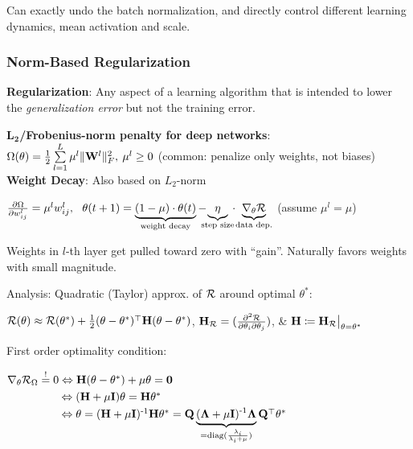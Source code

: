         Can exactly undo the batch normalization, and directly control different learning dynamics, mean activation and scale.
    
    \subsubsection{Norm-Based Regularization}
    \label{ssub:normbasedregularization}
        \textbf{Regularization}: Any aspect of a learning algorithm that is intended to lower the \emph{generalization error} but not the training error.
        
        \textbf{$\mathbf{L_2}$/Frobenius-norm penalty for deep networks}:\\ \tab$\Omega(\theta)=\frac{1}{2}\sum\limits_{l=1}^L\mu^l\lVert\mathbf W^l\rVert^2_F,\>\mu^l\geq0$ \begingroup\tiny{(common: penalize only weights, not biases)}\endgroup\\
        
        \textbf{Weight Decay}: Also based on $L_2$-norm
        
        \tab$\frac{\partial \Omega}{\partial w^l_{ij}}=\mu^l w^l_{ij},\>\>\>\theta(t+1)=\underbrace{(1-\mu)\cdot\theta(t)}_\text{weight decay}-\!\!\!\!\underbrace{\eta}_\text{step size}\!\!\cdot\!\underbrace{\nabla_\theta\mathcal{R}}_\text{data dep.}$ (assume $\mu^l=\mu$)
        
        Weights in $l$-th layer get pulled toward zero with ``gain''. Naturally favors weights with small magnitude.
        
        Analysis: Quadratic (Taylor) approx. of $\mathcal{R}$ around optimal $\theta^*$:

        \tab$\mathcal{R}(\theta)\approx\mathcal{R}(\theta^*)+\frac{1}{2}(\theta-\theta^*)^{\mathop{\mathrm{\top}}}\mathbf H(\theta-\theta^*)$, $\mathbf H_{\mathcal{R}}=(\frac{\partial^2\mathcal{R}}{\partial\theta_i\partial\theta_j})$, \& $\mathbf H\coloneqq\mathbf H_{\mathcal{R}}\bigr|_{\theta=\theta^*}$
        
        First order optimality condition:
        
        \tab$\nabla_\theta\mathcal{R}_\Omega\overset{!}{=}0\Leftrightarrow\mathbf H(\theta-\theta^*)+\mu\theta=\mathbf{0}$\\
        \tab$\phantom{\nabla_\theta\cR_\Omega\overset{!}{=}0}\Leftrightarrow(\vH+\mu\vI)\theta=\vH\theta^*$\\
        \tab$\phantom{\nabla_\theta\cR_\Omega\overset{!}{=}0}\Leftrightarrow\theta=(\vH+\mu\vI)\inv\vH\theta^*=\vQ\underbrace{(\vLa+\mu\vI)\inv\vLa}_{=\text{diag}(\frac{\lambda_i}{\lambda_i+\mu})}\vQ\T\theta^*$
        
